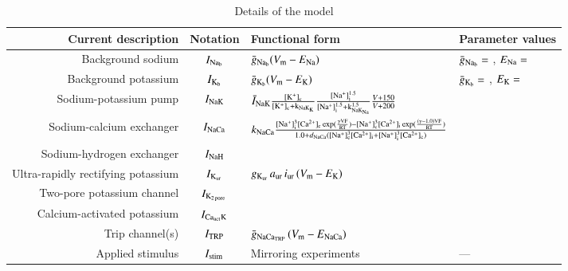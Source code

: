 \begin{table}
\begin{tabular}{r c l l}
\hline\hline
Current description & Notation & Functional form & Parameter values \\ [0.5ex]
\hline
Background sodium & $I_{\rm Na_b}$ & $\bar{g}_{\rm Na_b} (V_{\rm m} - E_{\rm Na})$ \cite{UNKNOWN}
                          & $\bar{g}_{\rm Na_b} = $ \cite{UNKNOWN}, $E_{\rm Na} = $ \cite{UNKNOWN}\\
Background potassium & $I_{\rm K_b}$ & $\bar{g}_{\rm K_b} (V_{\rm m} - E_{\rm K})$ \cite{UNKNOWN}
                          & $\bar{g}_{\rm K_b} = $ \cite{UNKNOWN}, $E_{\rm K} = $ \cite{UNKNOWN}\\
Sodium-potassium pump & $I_{\rm NaK}$ & $\bar{I}_{\rm NaK}
\frac{[\rm K^{+}]_{\rm c}}{[\rm K^{+}]_{\rm c} + k_{\rm NaK_{K}}}
\frac{[\rm Na^{+}]^{1.5}_{\rm i}}{[\rm Na^{+}]^{1.5}_{\rm i} + k^{1.5}_{\rm
    NaK_{Na}}}
\frac{V + 150}{V + 200}$\cite{Nygrenetal1998} & \cite{Nygrenetal1998}\\
Sodium-calcium exchanger & $I_{\rm NaCa}$ & $k_{\rm NaCa}
\frac{[\rm Na^{+}]^{3}_{i}[\rm Ca^{2+}]_{c} \exp(\frac{\gamma V F}{R T}) -
[\rm Na^{+}]^{3}_{c}[\rm Ca^{2+}]_{i} \exp(\frac{(\gamma - 1.0) V F}{R T})}
{1.0 + d_{\rm NaCa}([\rm Na^{+}]^{3}_{c}[\rm Ca^{2+}]_{i} + [\rm
  Na^{+}]^{3}_{i}[\rm Ca^{2+}]_{c})}$
\cite{Nygrenetal1998} & \cite{Nygrenetal1998}\\
Sodium-hydrogen exchanger & $I_{\rm NaH}$ & \cite{UNKNOWN} & \cite{UNKNOWN}\\
Ultra-rapidly rectifying potassium & $I_{\rm K_{ur}}$ & $g_{\rm
  K_{ur}}\, a_{\rm ur}\, i_{\rm ur}\, (V_{\rm m} - E_{\rm K})$ \cite{Maleckaretal2009} & \cite{Maleckaretal2009}\\
Two-pore potassium channel & $I_{\rm K_{2\, pore}}$ & \cite{UNKNOWN} & \cite{UNKNOWN}\\
Calcium-activated potassium & $I_{\rm Ca_{act}K}$ & \cite{UNKNOWN} & \cite{UNKNOWN}\\
Trip channel(s) & $I_{\rm TRP}$ & $\bar{g}_{\rm NaCa_{TRP}}\, (V_{\rm
  m} - E_{\rm NaCa})$ \cite{UNKNOWN} & \cite{UNKNOWN}\\
Applied stimulus & $ I_{\rm stim}$ & Mirroring experiments \cite{Clarketal2011} &  --- \\ [1ex]
\hline
\end{tabular}
\caption{Details of the model}
\label{table:chondrocyte-model-details}
\end{table}


